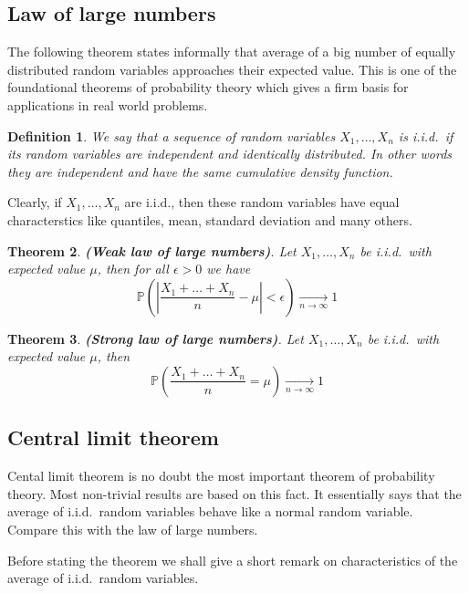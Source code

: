 \documentclass[12pt]{article}
\newtheorem{theorem}{Theorem}[subsection]
\newtheorem{definition}[theorem]{Definition}
\begin{document}
\subsection{Law of large numbers}

The following theorem states informally that average of a big number of equally
distributed random variables approaches their expected value. This is one of the
foundational theorems of probability theory which gives a firm basis for
applications in real world problems.

\begin{definition} We say that a sequence of random variables $X_1,\ldots,X_n$
    is i.i.d.\ if its random variables are independent and identically
    distributed. In other words they are independent and have the same
    cumulative density function.
\end{definition}

Clearly, if $X_1,\ldots,X_n$ are i.i.d., then these random variables have equal
characterstics like quantiles, mean, standard deviation and many others.

\begin{theorem} \textbf{(Weak law of large numbers)}. Let $X_1,\ldots,X_n$ be
    i.i.d.\ with expected value $\mu$, then for all $\epsilon>0$ we have
    $$
        \mathbb{P}\left(\left|\frac{X_1+\ldots+X_n}{n}    %
        -\mu\right|<\epsilon\right)\underset{n\to\infty}{\to}1
    $$
\end{theorem}

\begin{theorem} \textbf{(Strong law of large numbers)}.
    Let $X_1,\ldots,X_n$ be    %
    i.i.d.\ with expected value $\mu$, then
    $$
        \mathbb{P}\left(\frac{X_1+\ldots+X_n}{n}    %
        =\mu\right)\underset{n\to\infty}{\to}1
    $$
\end{theorem}

\subsection{Central limit theorem}

Cental limit theorem is no doubt the most important theorem of probability
theory. Most non-trivial results are based on this fact. It essentially says
that the average of i.i.d.\ random variables behave like a normal random
variable. Compare this with the law of large numbers.

Before stating the theorem we shall give a short remark on characteristics of
the average of i.i.d.\ random variables.
\end{document}
